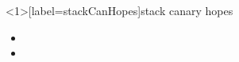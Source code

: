 
\begin{frame}<1>[label=stackCanHopes]{stack canary hopes}
    \begin{itemize}
    \item {}
    \item {}
    \end{itemize}
\end{frame}


